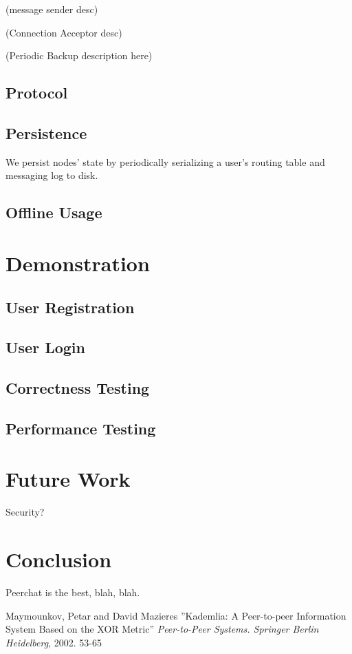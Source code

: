 \documentclass{article}
\begin{document}
(message sender desc)

(Connection Acceptor desc)

(Periodic Backup  description here)

\subsection{Protocol}

\subsection{Persistence}

We persist nodes' state by periodically serializing a user's routing table and messaging log to disk. 

\subsection{Offline Usage}

\section{Demonstration}

\subsection{User Registration}
\subsection{User Login}
\subsection{Correctness Testing}
\subsection{Performance Testing}

\section{Future Work}

Security?

\section{Conclusion}

Peerchat is the best, blah, blah.

\begin{thebibliography}{99}
   Maymounkov, Petar and David Mazieres
   ''Kademlia: A Peer-to-peer Information System Based on the XOR Metric''
   \textit{Peer-to-Peer Systems. Springer Berlin Heidelberg}, 2002. 53-65
 
\end{thebibliography}
\end{document}
